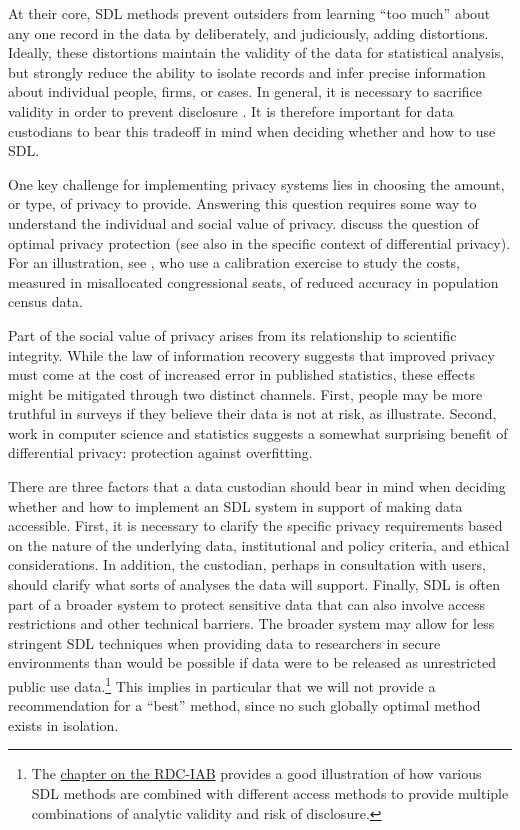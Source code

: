 \documentclass[
]{WileySix}
\begin{document}
At their core, SDL methods prevent outsiders from learning ``too much'' about any one record in the data \citep{dalenius_towards_1977} by deliberately, and judiciously, adding distortions. Ideally, these distortions maintain the validity of the data for statistical analysis, but strongly reduce the ability to isolate records and infer precise information about individual people, firms, or cases. In general, it is necessary to sacrifice validity in order to prevent disclosure \citep{goroff_balancing_2015, abowd_economic_2015}. It is therefore important for data custodians to bear this tradeoff in mind when deciding whether and how to use SDL.

One key challenge for implementing privacy systems lies in choosing the amount, or type, of privacy to provide. Answering this question requires some way to understand the individual and social value of privacy. \citet{abowd_economic_2019} discuss the question of optimal privacy protection (see also \citet{hsu_differential_2014} in the specific context of differential privacy). For an illustration, see \citet{spencer_effects_2015}, who use a calibration exercise to study the costs, measured in misallocated congressional seats, of reduced accuracy in population census data.

Part of the social value of privacy arises from its relationship to scientific integrity. While the law of information recovery suggests that improved privacy must come at the cost of increased error in published statistics, these effects might be mitigated through two distinct channels.
First, people may be more truthful in surveys if they believe their data is not at risk, as \citet{couper_risk_2008} illustrate. Second, work in computer science and statistics \citep{dwork_generalization_2015, dwork_fienberg_2018, cummings_adaptive_2016} suggests a somewhat surprising benefit of differential privacy: protection against overfitting.

There are three factors that a data custodian should bear in mind when deciding whether and how to implement an SDL system in support of making data accessible. First, it is necessary to clarify the specific privacy requirements based on the nature of the underlying data, institutional and policy criteria, and ethical considerations. In addition, the custodian, perhaps in consultation with users, should clarify what sorts of analyses the data will support. Finally, SDL is often part of a broader system to protect sensitive data that can also involve access restrictions and other technical barriers. The broader system may allow for less stringent SDL techniques when providing data to researchers in secure environments than would be possible if data were to be released as unrestricted public use data.\footnote{The \protect\hyperlink{iab}{chapter on the RDC-IAB} provides a good illustration of how various SDL methods are combined with different access methods to provide multiple combinations of analytic validity and risk of disclosure.} This implies in particular that we will not provide a recommendation for a ``best'' method, since no such globally optimal method exists in isolation.
\end{document}
